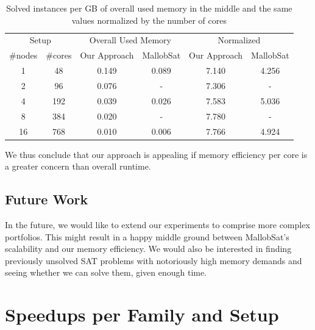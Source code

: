 \documentclass[12pt,a4paper,twoside]{scrartcl}
\numberwithin{equation}{section}
\begin{document}
\begin{table}[!h]
  \center
  \begin{tabular}{ cccccc }
    \toprule
    \multicolumn{2}{c}{Setup} & \multicolumn{2}{c}{Overall Used Memory} & \multicolumn{2}{c}{Normalized}\\
    \#nodes & \#cores & Our Approach & MallobSat & Our Approach & MallobSat \\
    \midrule
    1  & 48  & 0.149 & 0.089 & 7.140 & 4.256\\
    2  & 96  & 0.076 & -     & 7.306 & -\\
    4  & 192 & 0.039 & 0.026 & 7.583 & 5.036\\
    8  & 384 & 0.020 & -     & 7.780 & -\\
    16 & 768 & 0.010 & 0.006 & 7.766 & 4.924\\
    \bottomrule
  \end{tabular}
  \caption{Solved instances per GB of overall used memory in the middle and the same values normalized by the number of cores}
  \label{tab:solvedPerGB}
\end{table}

We thus conclude that our approach is appealing if memory efficiency per core is a greater concern than overall runtime. 

\subsection{Future Work}

In the future, we would like to extend our experiments to comprise more complex portfolios. This might result in a happy middle ground between MallobSat's scalability and our memory efficiency. We would also be interested in finding previously unsolved SAT problems with notoriously high memory demands and seeing whether we can solve them, given enough time.


\clearpage


\appendix

\section{Speedups per Family and Setup}
\label{app:speedupsFamiliesComplete}
\end{document}
